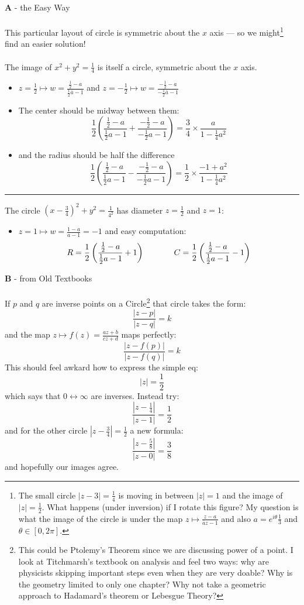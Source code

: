 \documentclass[12pt]{article}
\begin{document}
\noindent \textbf{A} - the Easy Way \\ \\
This particular layout of circle is symmetric about the $x$ axis --- so we might\footnote{The small circle $|z-3|=\frac{1}{4}$ is moving in between $|z|=1$ and the image of $|z|=\frac{1}{2}$.  What happens (under inversion) if I rotate this figure? My question is what the image of the circle is under the map $z \mapsto  \frac{z - a}{\overline{a}z-1} $ and also $a = e^{i\theta} \frac{1}{3}$ and $\theta \in [0, 2\pi]$. } find an easier solution! \\ \\
The image of $x^2 + y^2 = \frac{1}{4}$ is itself a circle, symmetric about the $x$ axis.  
\begin{itemize}
\item $z = \frac{1}{2} \mapsto w = \frac{\frac{1}{2}-a}{\frac{1}{2}\overline{a}-1}$
and $z = -\frac{1}{2} \mapsto w = \frac{ - \frac{1}{2}-a}{-\frac{1}{2}\overline{a}-1}$

\item The center should be midway between them:
$$ \frac{1}{2} \left(
\frac{\frac{1}{2}-a}{\frac{1}{2}a-1}
+ 
\frac{-\frac{1}{2}-a}{-\frac{1}{2}a-1}
\right)
= \frac{3}{4} \times \frac{ a }{1 - \frac{1}{4} a^2} $$
\item and the radius should be half the difference 
$$ \frac{1}{2} \left(
\frac{\frac{1}{2}-a}{\frac{1}{2}a-1}
- 
\frac{-\frac{1}{2}-a}{-\frac{1}{2}a-1}
\right)
= \frac{1}{2} \times \frac{ - 1+ a^2 }{1 - \frac{1}{4}a^2} $$
\end{itemize}
\hrule \vspace{6pt}
The circle $(x - \frac{3}{4})^2 + y^2 = \frac{1}{4^2}$ has diameter $z = \frac{1}{2}$ and $z = 1$:
\begin{itemize}
\item $z = 1 \mapsto w = \frac{1-a}{a-1}= - 1$ and  easy computation:
$$ R = \frac{1}{2} \left(
\frac{\frac{1}{2}-a}{\frac{1}{2}a-1}
+
1 \right) \hspace{0.5in} C = \frac{1}{2} \left(
\frac{\frac{1}{2}-a}{\frac{1}{2}a-1}
- 1
\right) $$
\end{itemize}

\newpage

\noindent \textbf{B} - from Old Textbooks \\ \\
If $p$ and $q$ are inverse points on a Circle\footnote{This could be Ptolemy's Theorem since we are discussing power of a point.  I look at Titchmarsh's textbook on analysis and feel two ways: why are physicists skipping important steps even when they are very doable?  Why is the geometry limited to only one chapter?  Why not take a geometric approach to Hadamard's theorem or Lebesgue Theory?} that circle takes the form:
$$ \frac{|z- p|}{|z- q|} = k$$
and the map $z \mapsto f(z) = \frac{az+b}{cz+d}$ maps perfectly:
$$ \frac{|z- f(p)|}{|z- f(q)|} = k$$
This should feel awkard how to express the simple eq:
$$ |z| = \frac{1}{2}$$
which says that $0\leftrightarrow \infty$ are inverses.  Instead try:
$$ \frac{|z - \frac{1}{4} |}{|z - 1|} = \frac{1}{2}$$
and for the other circle $|z - \frac{3}{4}| = \frac{1}{2} $ a new formula:
$$  \frac{|z-\frac{5}{8}|}{|z-0|} = \frac{3}{8} $$
and hopefully our images agree.
\end{document}
